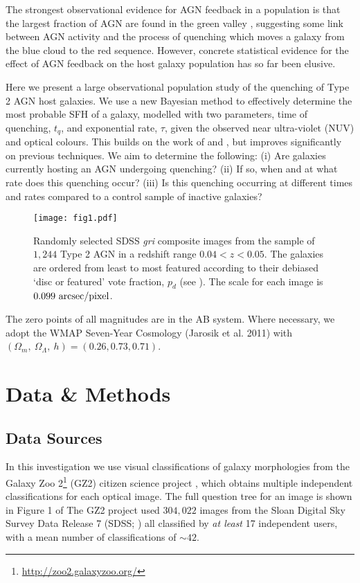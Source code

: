 \documentclass[useAMS,usenatbib]{mn2e}
\def\changed    {\color{nc} }
\begin{document}
The strongest observational evidence for AGN feedback in a population is that the largest fraction of AGN are found in the green valley \citep{CB08, Hickox09, Sch2010}, suggesting some link between AGN activity and  the process of quenching which moves a galaxy from the blue cloud to the red sequence. However, concrete statistical evidence for the effect of AGN feedback on the host galaxy population has so far been elusive.

Here we present a large observational population study of the quenching of Type 2 AGN host galaxies. 
We use a new Bayesian method \citep{Sme2015} to effectively determine the most probable SFH of a galaxy, modelled with two parameters, time of quenching, $t_q$, and exponential rate, $\tau$, given the observed near ultra-violet (NUV) and optical colours. {\changed This builds on the work of \citet{Martin07} and \citet{Sch2014}, but improves significantly on previous techniques. We} aim to determine the following: (i) Are galaxies currently hosting an AGN undergoing quenching? (ii) If so, when and at what rate does this quenching occur? (iii) Is this quenching occurring at different times and rates compared to a control sample of inactive galaxies?

\begin{figure*}
\texttt{[image: fig1.pdf]}
\caption{Randomly selected SDSS \emph{gri} composite images from the sample of $1,244$ Type 2 AGN in a redshift range $0.04 < z < 0.05$.  The galaxies are ordered from least to most featured according to their debiased `disc or featured' vote fraction, $p_d$ (see \citealt{GZ2}). The scale for each image is $0.099~\rm{arcsec/pixel}$.}
\label{mosaic}
\end{figure*}

The zero points of all magnitudes are in the AB system. Where necessary, we adopt the WMAP Seven-Year Cosmology (Jarosik et al. 2011) with $(\Omega_m , ~\Omega_\Lambda , ~h) = (0.26, 0.73, 0.71)$.



\section{Data \& Methods}

\subsection{Data Sources}\label{datasource}
In this investigation we use visual classifications of galaxy morphologies from the Galaxy Zoo 2\footnote{\url{http://zoo2.galaxyzoo.org/}} (GZ2) citizen science project \citep{GZ2}, which obtains multiple independent classifications for each optical image. The full question tree for an image is shown in Figure 1 of \citeauthor{GZ2}  The GZ2 project used $304, 022$ images from the Sloan Digital Sky Survey Data Release 7 (SDSS; \citealt{York2000, Abazajian09}) all classified by \emph{at least} 17 independent users, with a mean number of classifications of $\sim42$.
\end{document}

